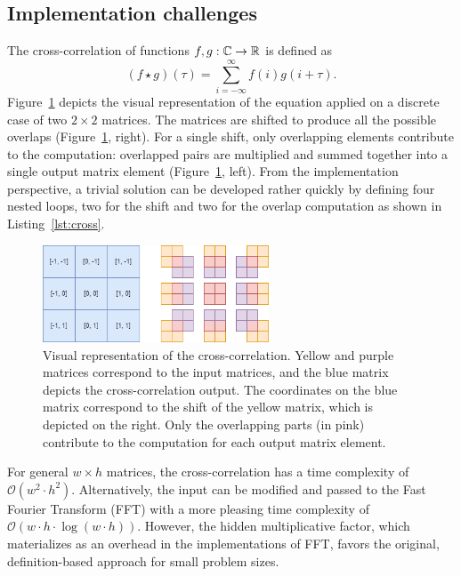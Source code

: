 \subsection{Implementation challenges}

The cross-correlation of functions $f, g: \mathbb{C}\rightarrow \mathbb{R}$ is defined as
\begin{equation}
    (f \star g)(\tau) = \sum_{i=-\infty}^{\infty} f(i) g(i+\tau).
\end{equation}
Figure~\ref{fig:cross-correlation} depicts the visual representation of the equation applied on a discrete case of two $2\times 2$ matrices. The matrices are shifted to produce all the possible overlaps (Figure~\ref{fig:cross-correlation}, right). For a single shift, only overlapping elements contribute to the computation: overlapped pairs are multiplied and summed together into a single output matrix element (Figure~\ref{fig:cross-correlation}, left). From the implementation perspective, a trivial solution can be developed rather quickly by defining four nested loops, two for the shift and two for the overlap computation as shown in Listing~\ref{lst:cross}.

\begin{figure}
    \centering
    \includegraphics[width=0.6\textwidth]{img/cc.png}
    \caption{Visual representation of the cross-correlation. Yellow and purple matrices correspond to the input matrices, and the blue matrix depicts the cross-correlation output. The coordinates on the blue matrix correspond to the shift of the yellow matrix, which is depicted on the right. Only the overlapping parts (in pink) contribute to the computation for each output matrix element.}
    \label{fig:cross-correlation}
\end{figure}

For general $w \times h$ matrices, the cross-correlation has a time complexity of $\mathcal{O}(w^2 \cdot h^2)$. Alternatively, the input can be modified and passed to the Fast Fourier Transform (FFT) with a more pleasing time complexity of $\mathcal{O}(w\cdot h \cdot \log(w\cdot h))$. However, the hidden multiplicative factor, which materializes as an overhead in the implementations of FFT, favors the original, definition-based approach for small problem sizes.

